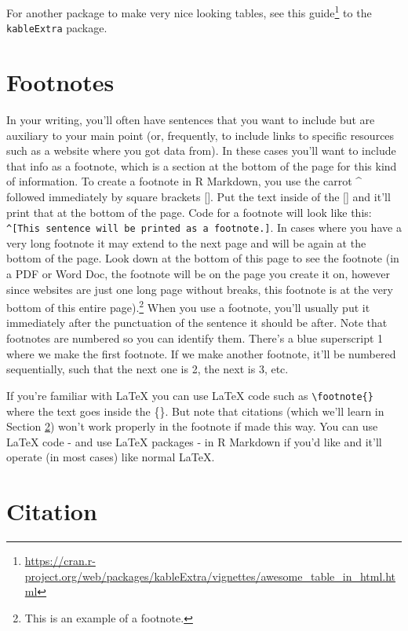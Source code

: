 \documentclass[
  a4paper,
]{krantz}
\renewcommand{\href}[2]{#2\footnote{\url{#1}}}
\begin{document}
For another package to make very nice looking tables, see
\href{https://cran.r-project.org/web/packages/kableExtra/vignettes/awesome_table_in_html.html}{this
guide} to the \texttt{kableExtra} package.

\hypertarget{footnotes}{%
\section{Footnotes}\label{footnotes}}

In your writing, you'll often have sentences that you want
to include but are auxiliary to your main point (or,
frequently, to include links to specific resources such as a
website where you got data from). In these cases you'll want
to include that info as a footnote, which is a section at
the bottom of the page for this kind of information. To
create a footnote in R Markdown, you use the carrot \^{}
followed immediately by square brackets {[}{]}. Put the text
inside of the {[}{]} and it'll print that at the bottom of
the page. Code for a footnote will look like this:
\texttt{\^{}{[}This\ sentence\ will\ be\ printed\ as\ a\ footnote.{]}}.
In cases where you have a very long footnote it may extend
to the next page and will be again at the bottom of the
page. Look down at the bottom of this page to see the
footnote (in a PDF or Word Doc, the footnote will be on the
page you create it on, however since websites are just one
long page without breaks, this footnote is at the very
bottom of this entire page).\footnote{This is an example of
  a footnote.} When you use a footnote, you'll usually put
it immediately after the punctuation of the sentence it
should be after. Note that footnotes are numbered so you can
identify them. There's a blue superscript 1 where we make
the first footnote. If we make another footnote, it'll be
numbered sequentially, such that the next one is 2, the next
is 3, etc.

If you're familiar with LaTeX you can use LaTeX code such as
\texttt{\textbackslash{}footnote\{\}} where the text goes
inside the \{\}. But note that citations (which we'll learn
in Section \ref{citation}) won't work properly in the
footnote if made this way. You can use LaTeX code - and use
LaTeX packages - in R Markdown if you'd like and it'll
operate (in most cases) like normal LaTeX.

\hypertarget{citation}{%
\section{Citation}\label{citation}}
\end{document}
